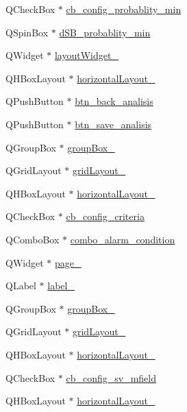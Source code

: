 \begin{DoxyCompactItemize}
\item 
Q\+Check\+Box $\ast$ \hyperlink{a00080_a6e32cc42adcf308df94cbbc9ac226f50}{cb\+\_\+config\+\_\+probablity\+\_\+min}
\item 
Q\+Spin\+Box $\ast$ \hyperlink{a00080_adfd6cf470c736f358c6982f9a635f04f}{d\+S\+B\+\_\+probablity\+\_\+min}
\item 
Q\+Widget $\ast$ \hyperlink{a00080_ac4725768128006ab5bea6e58b67959d0}{layout\+Widget\+\_}
\item 
Q\+H\+Box\+Layout $\ast$ \hyperlink{a00080_afb4ab27a4cd626c64c34ab3651fa8413}{horizontal\+Layout\+\_}
\item 
Q\+Push\+Button $\ast$ \hyperlink{a00080_a5704296b847187d5975858d04c8c2513}{btn\+\_\+back\+\_\+analisis}
\item 
Q\+Push\+Button $\ast$ \hyperlink{a00080_a231adeaeca96ac21170495bfb1422e5e}{btn\+\_\+save\+\_\+analisis}
\item 
Q\+Group\+Box $\ast$ \hyperlink{a00080_af55cd87dbe0f7d42980b1012f15cae2d}{group\+Box\+\_}
\item 
Q\+Grid\+Layout $\ast$ \hyperlink{a00080_aa03590dd5aac614bf717649a544c015f}{grid\+Layout\+\_}
\item 
Q\+H\+Box\+Layout $\ast$ \hyperlink{a00080_a1351e317cba7ca711b6b4d2212b6bf36}{horizontal\+Layout\+\_}
\item 
Q\+Check\+Box $\ast$ \hyperlink{a00080_a89574c631636929702a5928b2a159892}{cb\+\_\+config\+\_\+criteria}
\item 
Q\+Combo\+Box $\ast$ \hyperlink{a00080_a2af463e4a88fddd219f2e41a386fbd68}{combo\+\_\+alarm\+\_\+condition}
\item 
Q\+Widget $\ast$ \hyperlink{a00080_a48c3dca01f963265cd2ffca998842e05}{page\+\_}
\item 
Q\+Label $\ast$ \hyperlink{a00080_af183bfbfb9f38bbdd60caf92b15e23dc}{label\+\_}
\item 
Q\+Group\+Box $\ast$ \hyperlink{a00080_a417cb0342ea95d3fe5f7e3f4feeb6515}{group\+Box\+\_}
\item 
Q\+Grid\+Layout $\ast$ \hyperlink{a00080_adbbd44debcfc24db144006951bf7b3e1}{grid\+Layout\+\_}
\item 
Q\+H\+Box\+Layout $\ast$ \hyperlink{a00080_a49a16c34d46bb0d66edb10c3b92b226c}{horizontal\+Layout\+\_}
\item 
Q\+Check\+Box $\ast$ \hyperlink{a00080_a0a83284035ab2dbaeb39946522434986}{cb\+\_\+config\+\_\+sv\+\_\+mfield}
\item 
Q\+H\+Box\+Layout $\ast$ \hyperlink{a00080_a8cfe172f7719cf363fc630c536cad6c3}{horizontal\+Layout\+\_}

\end{DoxyCompactItemize}
